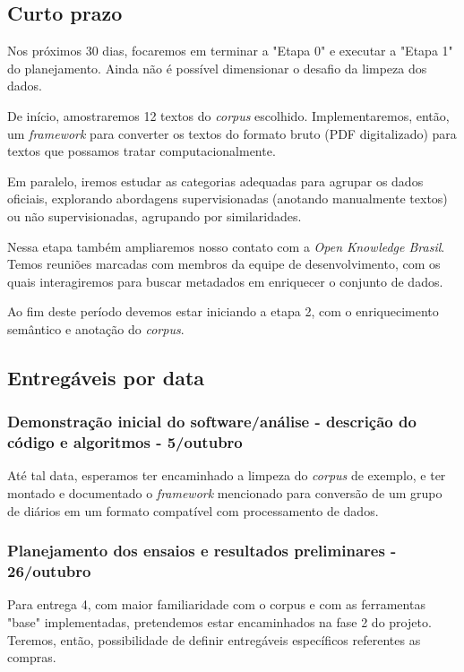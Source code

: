 \documentclass[10pt, a4paper]{article}
\begin{document}
\subsection{Curto prazo}

Nos próximos 30 dias, focaremos em terminar a "Etapa 0" e executar a "Etapa 1" do planejamento. Ainda não é possível dimensionar o desafio da limpeza dos dados. 

De início, amostraremos 12 textos do \textit{corpus} escolhido. Implementaremos, então, um \textit{framework} para converter os textos do formato bruto (PDF digitalizado) para textos que possamos tratar computacionalmente. 

Em paralelo, iremos estudar as categorias adequadas para agrupar os dados oficiais, explorando abordagens supervisionadas (anotando manualmente textos) ou não supervisionadas, agrupando por similaridades. 

Nessa etapa também ampliaremos nosso contato com a \textit{Open Knowledge Brasil}. Temos reuniões marcadas com membros da equipe de desenvolvimento, com os quais interagiremos para buscar metadados em enriquecer o conjunto de dados. 

Ao fim deste período devemos estar iniciando a etapa 2, com o enriquecimento semântico e anotação do \textit{corpus}.

\subsection{Entregáveis por data}

\subsubsection{Demonstração inicial do software/análise - descrição do código e algoritmos  - 5/outubro}

Até tal data, esperamos ter encaminhado a limpeza do \textit{corpus} de exemplo, e ter montado e documentado o \textit{framework} mencionado para conversão de um grupo de diários em um formato compatível com processamento de dados. 


\subsubsection{Planejamento dos ensaios e resultados preliminares - 26/outubro}

Para entrega 4, com maior familiaridade com o corpus e com as ferramentas "base" implementadas, pretendemos estar encaminhados na fase 2 do projeto. Teremos, então, possibilidade de definir entregáveis específicos referentes as compras. 
\end{document}
